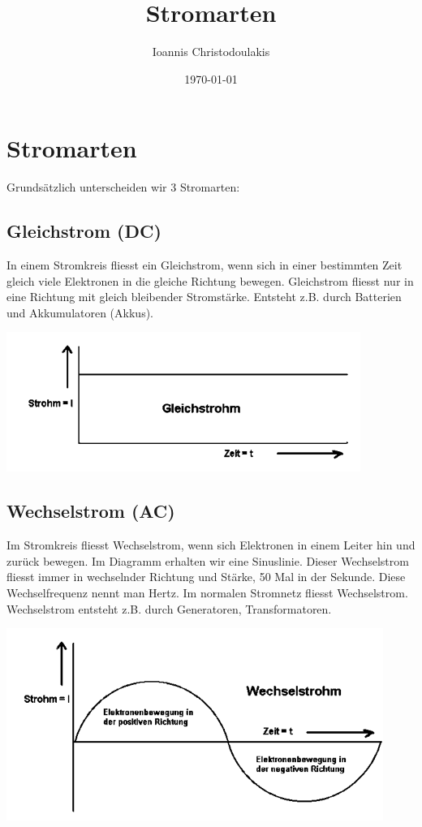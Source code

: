 \documentclass[11pt, a4paper, twoside, fleqn]{article}
\title{Stromarten}
\author{Ioannis Christodoulakis}
\date{\today}
\begin{document}
\maketitle
\newpage
\tableofcontents
\newpage
\section{Stromarten}
Grundsätzlich unterscheiden wir 3 Stromarten:
\subsection{Gleichstrom (DC)}
\begin{flushleft}
In einem Stromkreis fliesst ein Gleichstrom, wenn sich in einer bestimmten Zeit gleich viele Elektronen in die gleiche Richtung bewegen. Gleichstrom fliesst nur in eine Richtung mit gleich bleibender Stromstärke. Entsteht z.B. durch Batterien und Akkumulatoren (Akkus).
\end{flushleft}
\includegraphics[scale=0.6]{DC_Strom}
\subsection{Wechselstrom (AC)}
\begin{flushleft}
Im Stromkreis fliesst Wechselstrom, wenn sich Elektronen in einem Leiter hin und zurück bewegen. Im Diagramm erhalten wir eine Sinuslinie. Dieser Wechselstrom fliesst immer in wechselnder Richtung und Stärke, 50 Mal in der Sekunde. Diese Wechselfrequenz nennt man Hertz. Im normalen Stromnetz fliesst Wechselstrom. Wechselstrom entsteht z.B. durch Generatoren, Transformatoren.
\end{flushleft}
\includegraphics[scale=0.6]{AC_Strom}
\end{document}
